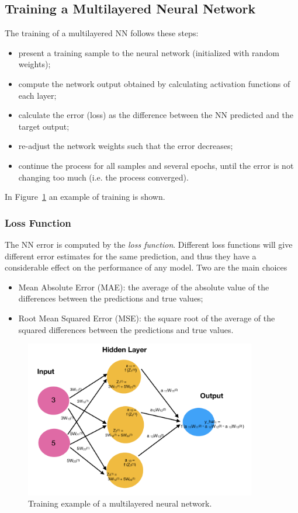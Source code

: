 \subsection{Training a Multilayered Neural Network}
\label{training-a-multilayered-neural-network}

The training of a multilayered NN follows these steps:

\begin{itemize}
\tightlist
\item present a training sample to the neural network (initialized with random weights);
\item compute the network output obtained by calculating activation functions of each layer;
\item calculate the error (loss) as the difference between the NN predicted and the target output;
\item re-adjust the network weights such that the error decreases;
\item continue the process for all samples and several epochs, until the error is not changing too much (i.e. the process converged).
\end{itemize}
In Figure~\ref{fig:training} an example of training is shown.

\subsubsection{Loss Function}
The NN error is computed by the \emph{loss function}. Different loss functions will give different error estimates for the same prediction, and thus they have a considerable effect on the performance of any model. Two are the main choices

\begin{itemize}
\tightlist
\item Mean Absolute Error (MAE): the average of the absolute value of the differences between the predictions and true values;
\item Root Mean Squared Error (MSE): the square root of the average of the squared differences between the predictions and true values.
\end{itemize}

\begin{figure}[htb]
\centering
\includegraphics[width=0.9\textwidth]{figures/training_nn}
\caption{Training example of a multilayered neural network.}
\label{fig:training}
\end{figure}


